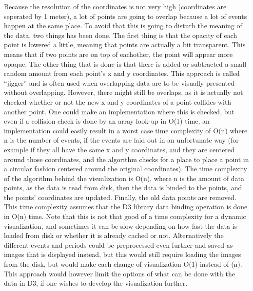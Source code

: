 \documentclass[Report.tex]{subfiles}
\begin{document}
Because the resolution of the coordinates is not very high (coordinates are seperated by 1 meter), a lot of points are going to overlap because a lot of events happen at the same place. To avoid that this is going to disturb the meaning of the data, two things has been done. The first thing is that the opacity of each point is lowered a little, meaning that points are actually a bit transparent. This means that if two points are on top of eachother, the point will appear more opaque. The other thing that is done is that there is added or subtracted a small random amount from each point's x and y coordinates. This approach is called ``jigger'' and is often used when overlapping data are to be visually presented without overlapping. However, there might still be overlaps, as it is actually not checked whether or not the new x and y coordinates of a point collides with another point. One could make an implementation where this is checked, but even if a collision check is done by an array look-up in O(1) time, an implementation could easily result in a worst case time complexity of O(n) where n is the number of events, if the events are laid out in an unfortunate way (for example if they all have the same x and y coordinates, and they are centered around those coordinates, and the algorithm checks for a place to place a point in a circular fashion centered around the original coordinates). The time complexity of the algorithm behind the visualization is O(n), where n is the amount of data points, as the data is read from disk, then the data is binded to the points, and the points' coordinates are updated. Finally, the old data points are removed. This time complexity assumes that the D3 library data binding operation is done in O(n) time. Note that this is not that good of a time complexity for a dynamic visualization, and sometimes it can be slow depending on how fast the data is loaded from disk or whether it is already cached or not. Alternatively the different events and periods could be preprocessed even further and saved as images that is displayed instead, but this would still require loading the images from the disk, but would make each change of visualization O(1) instead of (n). This approach would however limit the options of what can be done with the data in D3, if one wishes to develop the visualization further.
\end{document}
